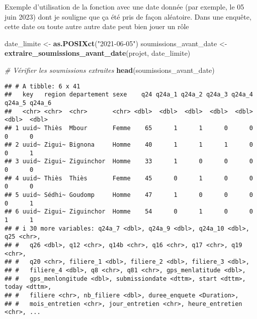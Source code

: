\documentclass[
]{article}
\newenvironment{Shaded}{\begin{snugshade}}{\end{snugshade}}
\newcommand{\CommentTok}[1]{\textcolor[rgb]{0.56,0.35,0.01}{\textit{#1}}}
\newcommand{\FunctionTok}[1]{\textcolor[rgb]{0.13,0.29,0.53}{\textbf{#1}}}
\newcommand{\NormalTok}[1]{#1}
\newcommand{\OtherTok}[1]{\textcolor[rgb]{0.56,0.35,0.01}{#1}}
\newcommand{\StringTok}[1]{\textcolor[rgb]{0.31,0.60,0.02}{#1}}
\begin{document}
Exemple d'utilisation de la fonction avec une date donnée (par exemple,
le 05 juin 2023) dont je souligne que ça été pris de façon aléatoire.
Dans une enquête, cette date ou toute autre autre date peut bien jouer
un rôle

\begin{Shaded}
\begin{Highlighting}[]
\NormalTok{date\_limite }\OtherTok{\textless{}{-}} \FunctionTok{as.POSIXct}\NormalTok{(}\StringTok{"2021{-}06{-}05"}\NormalTok{)}
\NormalTok{soumissions\_avant\_date }\OtherTok{\textless{}{-}} \FunctionTok{extraire\_soumissions\_avant\_date}\NormalTok{(projet, date\_limite)}

\CommentTok{\# Vérifier les soumissions extraites}
\FunctionTok{head}\NormalTok{(soumissions\_avant\_date)}
\end{Highlighting}
\end{Shaded}

\begin{verbatim}
## # A tibble: 6 x 41
##   key   region departement sexe    q24 q24a_1 q24a_2 q24a_3 q24a_4 q24a_5 q24a_6
##   <chr> <chr>  <chr>       <chr> <dbl>  <dbl>  <dbl>  <dbl>  <dbl>  <dbl>  <dbl>
## 1 uuid~ Thiès  Mbour       Femme    65      1      1      0      0      0      0
## 2 uuid~ Zigui~ Bignona     Homme    40      1      1      1      0      0      1
## 3 uuid~ Zigui~ Ziguinchor  Homme    33      1      0      0      0      0      0
## 4 uuid~ Thiès  Thiès       Femme    45      0      1      0      0      0      0
## 5 uuid~ Sédhi~ Goudomp     Homme    47      1      0      0      0      0      1
## 6 uuid~ Zigui~ Ziguinchor  Homme    54      0      1      0      0      1      1
## # i 30 more variables: q24a_7 <dbl>, q24a_9 <dbl>, q24a_10 <dbl>, q25 <chr>,
## #   q26 <dbl>, q12 <chr>, q14b <chr>, q16 <chr>, q17 <chr>, q19 <chr>,
## #   q20 <chr>, filiere_1 <dbl>, filiere_2 <dbl>, filiere_3 <dbl>,
## #   filiere_4 <dbl>, q8 <chr>, q81 <chr>, gps_menlatitude <dbl>,
## #   gps_menlongitude <dbl>, submissiondate <dttm>, start <dttm>, today <dttm>,
## #   filiere <chr>, nb_filiere <dbl>, duree_enquete <Duration>,
## #   mois_entretien <chr>, jour_entretien <chr>, heure_entretien <chr>, ...
\end{verbatim}
\end{document}
